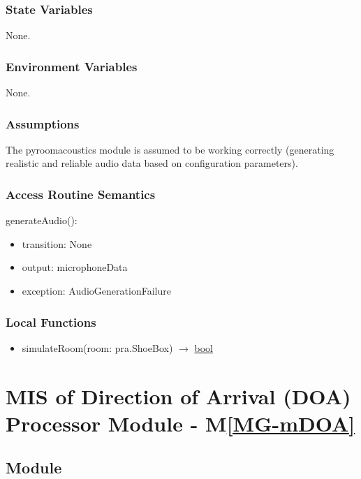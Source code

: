 \documentclass[12pt, titlepage]{article}
\newcommand{\mref}[1]{M\ref{#1}}
\begin{document}
\subsubsection{State Variables}

None.

\subsubsection{Environment Variables}

None.

\subsubsection{Assumptions}

The pyroomacoustics module is assumed to be working correctly (generating
realistic and reliable audio data based on configuration parameters).

\subsubsection{Access Routine Semantics}

\noindent generateAudio():
\begin{itemize}
\item transition: None
\item output: microphoneData
\item exception: AudioGenerationFailure
\end{itemize}

\subsubsection{Local Functions}

\begin{itemize}
\item simulateRoom(room: pra.ShoeBox) $\rightarrow$
  \hyperref[generic:bool]{bool}
\end{itemize}

\newpage
\section{MIS of Direction of Arrival (DOA) Processor Module - \mref{MG-mDOA}}
\label{mod:DOA}

\subsection{Module}
\end{document}
